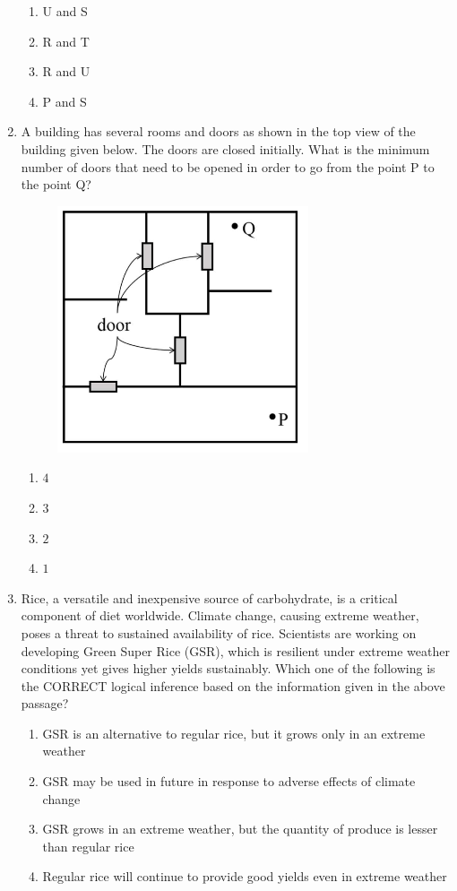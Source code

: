\documentclass[journal]{IEEEtran}
\begin{document}
\begin{enumerate}
\hfill{}
\begin{enumerate}
\item U and S
\item R and T
\item R and U
\item P and S
\end{enumerate}

\item A building has several rooms and doors as shown in the top view of the building given below. The doors are closed initially. What is the minimum number of doors that need to be opened in order to go from the point P to the point Q?

\hfill{}
\begin{figure}[H]
\centering
\includegraphics[width = 0.42\columnwidth]{figs/01.png}
\caption*{}
\label{fig:q5}
\end{figure}
\begin{enumerate}
\item $4$
\item $3$
\item $2$
\item $1$
\end{enumerate}

\item Rice, a versatile and inexpensive source of carbohydrate, is a critical component of diet worldwide. Climate change, causing extreme weather, poses a threat to sustained availability of rice. Scientists are working on developing Green Super Rice (GSR), which is resilient under extreme weather conditions yet gives higher yields sustainably. Which one of the following is the CORRECT logical inference based on the information given in the above passage?

\hfill{}
\begin{enumerate}
\item GSR is an alternative to regular rice, but it grows only in an extreme weather
\item GSR may be used in future in response to adverse effects of climate change
\item GSR grows in an extreme weather, but the quantity of produce is lesser than regular rice
\item Regular rice will continue to provide good yields even in extreme weather
\end{enumerate}


\end{enumerate}
\end{document}
